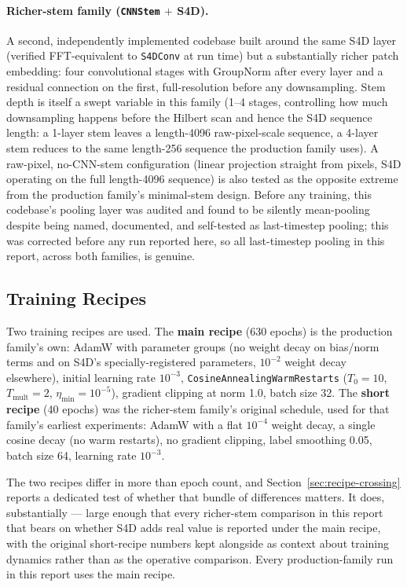 \documentclass[11pt]{article}
\begin{document}
\paragraph{Richer-stem family (\texttt{CNNStem} $+$ S4D).} A second, independently implemented
codebase built around the same S4D layer (verified FFT-equivalent to \texttt{S4DConv} at run
time) but a substantially richer patch embedding: four convolutional stages with GroupNorm
after every layer and a residual connection on the first, full-resolution before any
downsampling. Stem depth is itself a swept variable in this family (1--4 stages, controlling
how much downsampling happens before the Hilbert scan and hence the S4D sequence length: a
1-layer stem leaves a length-4096 raw-pixel-scale sequence, a 4-layer stem reduces to the same
length-256 sequence the production family uses). A raw-pixel, no-CNN-stem configuration
(linear projection straight from pixels, S4D operating on the full length-4096 sequence) is
also tested as the opposite extreme from the production family's minimal-stem design. Before
any training, this codebase's pooling layer was audited and found to be silently
mean-pooling despite being named, documented, and self-tested as last-timestep pooling; this
was corrected before any run reported here, so all last-timestep pooling in this report,
across both families, is genuine.

\subsection{Training Recipes}
\label{sec:recipes}
Two training recipes are used. The \textbf{main recipe} (630 epochs) is the production
family's own: AdamW with parameter groups (no weight decay on bias/norm terms and on S4D's
specially-registered parameters, $10^{-2}$ weight decay elsewhere), initial learning rate
$10^{-3}$, \texttt{CosineAnnealingWarmRestarts} ($T_0{=}10$, $T_{\text{mult}}{=}2$,
$\eta_{\min}{=}10^{-5}$), gradient clipping at norm 1.0, batch size 32. The
\textbf{short recipe} (40 epochs) was the richer-stem family's original schedule, used for
that family's earliest experiments: AdamW with a flat $10^{-4}$ weight decay, a single cosine
decay (no warm restarts), no gradient clipping, label smoothing 0.05, batch size 64, learning
rate $10^{-3}$.

The two recipes differ in more than epoch count, and Section~\ref{sec:recipe-crossing}
reports a dedicated test of whether that bundle of differences matters. It does, substantially
--- large enough that every richer-stem comparison in this report that bears on whether S4D
adds real value is reported under the main recipe, with the original short-recipe numbers
kept alongside as context about training dynamics rather than as the operative comparison.
Every production-family run in this report uses the main recipe.
\end{document}
